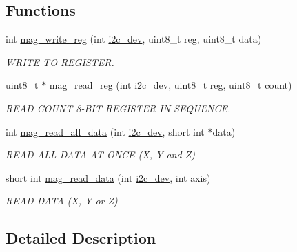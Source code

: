 \subsection*{Functions}
\begin{DoxyCompactItemize}
\item 
int \hyperlink{group__mag_gab5d0ae421cd4bb10b1b7a1eda167416b}{mag\-\_\-write\-\_\-reg} (int \hyperlink{CommunicationV0_2communication_8c_a7751bd45ac1064efb35adf1f19c25db8}{i2c\-\_\-dev}, uint8\-\_\-t reg, uint8\-\_\-t data)
\begin{DoxyCompactList}\small\item\em W\-R\-I\-T\-E T\-O R\-E\-G\-I\-S\-T\-E\-R. \end{DoxyCompactList}\item 
uint8\-\_\-t $\ast$ \hyperlink{group__mag_ga6830eaeae2298320e1e8c902e4edd709}{mag\-\_\-read\-\_\-reg} (int \hyperlink{CommunicationV0_2communication_8c_a7751bd45ac1064efb35adf1f19c25db8}{i2c\-\_\-dev}, uint8\-\_\-t reg, uint8\-\_\-t count)
\begin{DoxyCompactList}\small\item\em R\-E\-A\-D C\-O\-U\-N\-T 8-\/\-B\-I\-T R\-E\-G\-I\-S\-T\-E\-R I\-N S\-E\-Q\-U\-E\-N\-C\-E. \end{DoxyCompactList}\item 
int \hyperlink{group__mag_gab42ae0d0a2a6f37cf36d856c072b7f34}{mag\-\_\-read\-\_\-all\-\_\-data} (int \hyperlink{CommunicationV0_2communication_8c_a7751bd45ac1064efb35adf1f19c25db8}{i2c\-\_\-dev}, short int $\ast$data)
\begin{DoxyCompactList}\small\item\em R\-E\-A\-D A\-L\-L D\-A\-T\-A A\-T O\-N\-C\-E (X, Y and Z) \end{DoxyCompactList}\item 
short int \hyperlink{group__mag_ga542a31ccd07cd2c3e8e2b68cdb6d219e}{mag\-\_\-read\-\_\-data} (int \hyperlink{CommunicationV0_2communication_8c_a7751bd45ac1064efb35adf1f19c25db8}{i2c\-\_\-dev}, int axis)
\begin{DoxyCompactList}\small\item\em R\-E\-A\-D D\-A\-T\-A (X, Y or Z) \end{DoxyCompactList}\end{DoxyCompactItemize}


\subsection{Detailed Description}


